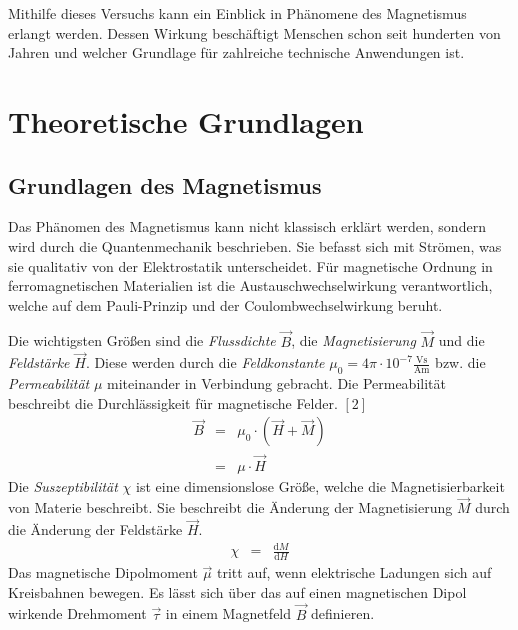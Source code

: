 \documentclass[12pt,a4paper]{scrartcl}
\numberwithin{equation}{section} %
\newcommand{\pu}[1]{\ensuremath{\mathrm{#1}}}
\renewcommand{\[}{} %
\renewcommand{\]}{\noindent} %
\begin{document}
Mithilfe dieses Versuchs kann ein Einblick in Phänomene des Magnetismus
erlangt werden. Dessen Wirkung beschäftigt Menschen schon seit hunderten
von Jahren und welcher Grundlage für zahlreiche technische Anwendungen
ist.

\hypertarget{theoretische-grundlagen}{%
\section{Theoretische Grundlagen}\label{theoretische-grundlagen}}

\hypertarget{grundlagen-des-magnetismus}{%
\subsection{Grundlagen des
Magnetismus}\label{grundlagen-des-magnetismus}}

Das Phänomen des Magnetismus kann nicht klassisch erklärt werden,
sondern wird durch die Quantenmechanik beschrieben. Sie befasst sich mit
Strömen, was sie qualitativ von der Elektrostatik unterscheidet. Für
magnetische Ordnung in ferromagnetischen Materialien ist die
Austauschwechselwirkung verantwortlich, welche auf dem Pauli-Prinzip und
der Coulombwechselwirkung beruht.

Die wichtigsten Größen sind die \emph{Flussdichte} \(\vec B\), die
\emph{Magnetisierung} \(\vec M\) und die \emph{Feldstärke} \(\vec H\).
Diese werden durch die \emph{Feldkonstante}
\(\mu_0=4\pi\cdot\pu{10^{-7}\frac{Vs}{Am}}\) bzw. die
\emph{Permeabilität} \(\mu\) miteinander in Verbindung gebracht. Die
Permeabilität beschreibt die Durchlässigkeit für magnetische Felder.
\([2]\) \[
\begin{eqnarray}
    \vec B
        &=& \mu_0 \cdot \left(\vec H + \vec M\right) \label{M1} \\
        &=& \mu \cdot \vec H
\end{eqnarray}
\] Die \emph{Suszeptibilität} \(\chi\) ist eine dimensionslose Größe,
welche die Magnetisierbarkeit von Materie beschreibt. Sie beschreibt die
Änderung der Magnetisierung \(\vec M\) durch die Änderung der Feldstärke
\(\vec H\). \[
\begin{eqnarray}
    \chi &=& \frac{\mathrm dM}{\mathrm dH} \label{Chi}
\end{eqnarray}
\] Das magnetische Dipolmoment \(\vec \mu\) tritt auf, wenn elektrische
Ladungen sich auf Kreisbahnen bewegen. Es lässt sich über das auf einen
magnetischen Dipol wirkende Drehmoment \(\vec \tau\) in einem Magnetfeld
\(\vec B\) definieren.
\end{document}
